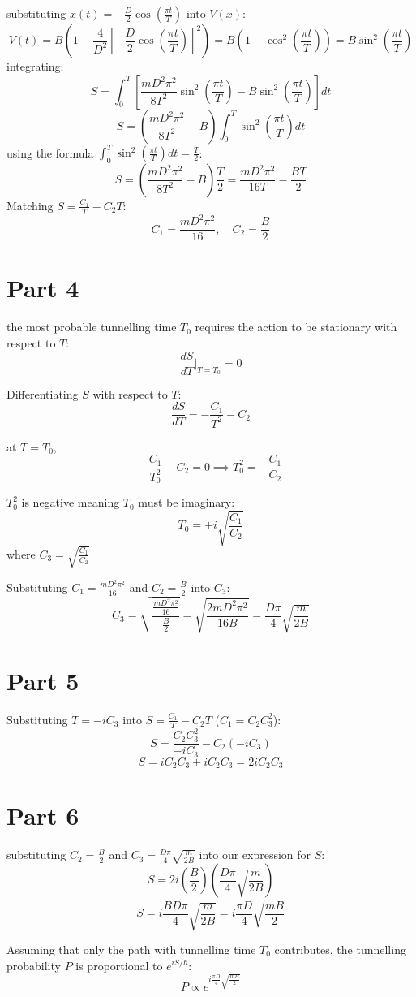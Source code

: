 \documentclass{article}
\begin{document}
substituting $x(t) = -\frac{D}{2}\cos\left(\frac{\pi t}{T}\right)$ into $V(x)$:
\[
V(t) = B \left(1 - \frac{4}{D^2} \left[ -\frac{D}{2}\cos\left(\frac{\pi t}{T}\right) \right]^2\right) = B \left(1 - \cos^2\left(\frac{\pi t}{T}\right)\right) = B \sin^2\left(\frac{\pi t}{T}\right)
\]
integrating:
\[
S = \int_{0}^{T} \left[ \frac{m D^2 \pi^2}{8 T^2} \sin^2\left(\frac{\pi t}{T}\right) - B \sin^2\left(\frac{\pi t}{T}\right) \right] dt
\]
\[
S = \left( \frac{m D^2 \pi^2}{8 T^2} - B \right) \int_{0}^{T} \sin^2\left(\frac{\pi t}{T}\right) dt
\]
using the formula $\int_{0}^{T} \sin^2\left(\frac{\pi t}{T}\right)dt = \frac{T}{2}$:
\[
S = \left( \frac{m D^2 \pi^2}{8 T^2} - B \right) \frac{T}{2} = \frac{m D^2 \pi^2}{16 T} - \frac{B T}{2}
\]
Matching $S = \frac{C_1}{T} - C_2 T$:
\[
C_1 = \frac{m D^2 \pi^2}{16}, \quad C_2 = \frac{B}{2}
\]

\section{Part 4}

the most probable tunnelling time $T_0$ requires the action to be stationary with respect to $T$:
\[
\frac{dS}{dT}\Big|_{T=T_0} = 0
\]

Differentiating $S$ with respect to $T$:
\[
\frac{dS}{dT} = -\frac{C_1}{T^2} - C_2
\]

at $T = T_0$,
\[
-\frac{C_1}{T_0^2} - C_2 = 0 \implies T_0^2 = -\frac{C_1}{C_2}
\]

$T_0^2$ is negative meaning $T_0$ must be imaginary:
\[
T_0 = \pm i \sqrt{\frac{C_1}{C_2}}
\]
where $C_3 = \sqrt{\frac{C_1}{C_2}}$

Substituting $C_1 = \frac{m D^2 \pi^2}{16}$ and $C_2 = \frac{B}{2}$ into $C_3$:
\[
C_3 = \sqrt{\frac{\frac{m D^2 \pi^2}{16}}{\frac{B}{2}}} = \sqrt{\frac{2m D^2 \pi^2}{16 B}} = \frac{D\pi}{4}\sqrt{\frac{m}{2B}}
\]

\section{Part 5}

Substituting $T = -iC_3$ into $S = \frac{C_1}{T} - C_2 T$ ($C_1 = C_2 C_3^2$):
\[
S = \frac{C_2 C_3^2}{-i C_3} - C_2(-i C_3)
\]
\[
S = i C_2 C_3 + i C_2 C_3 = 2i C_2 C_3
\]

\section{Part 6}

substituting $C_2 = \frac{B}{2}$ and $C_3 = \frac{D\pi}{4}\sqrt{\frac{m}{2B}}$ into our expression for $S$:
\[
S = 2i \left(\frac{B}{2}\right) \left(\frac{D\pi}{4}\sqrt{\frac{m}{2B}}\right)
\]
\[
S = i \frac{B D \pi}{4} \sqrt{\frac{m}{2B}} = i \frac{\pi D}{4} \sqrt{\frac{mB}{2}}
\]

Assuming that only the path with tunnelling time $T_0$ contributes, the tunnelling probability $P$ is proportional to $e^{iS/\hbar}$:
\[
P \propto e^{i \frac{\pi D}{4} \sqrt{\frac{mB}{2}}}
\]
\end{document}
